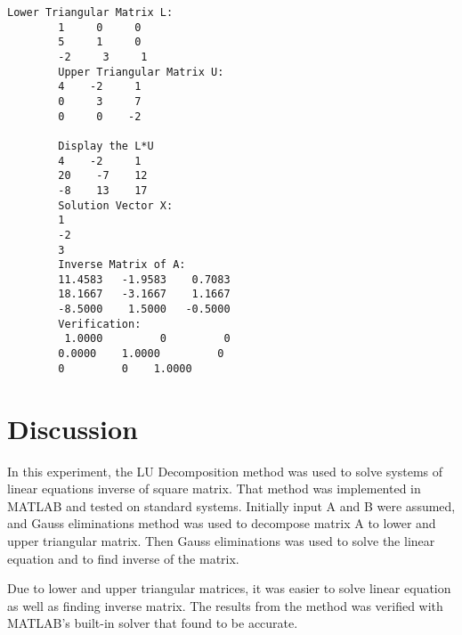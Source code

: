 \documentclass[a4paper,12pt]{article}
\begin{document}
	\begin{lstlisting}[style=vscode-light, caption={Command Window for LU Decomposition} ]
		Lower Triangular Matrix L:
		1     0     0
		5     1     0
		-2     3     1
		Upper Triangular Matrix U:
		4    -2     1
		0     3     7
		0     0    -2

		Display the L*U
		4    -2     1
		20    -7    12
		-8    13    17
		Solution Vector X:
		1
		-2
		3
		Inverse Matrix of A:
		11.4583   -1.9583    0.7083
		18.1667   -3.1667    1.1667
		-8.5000    1.5000   -0.5000
	    Verification:
	     1.0000         0         0
	    0.0000    1.0000         0
	    0         0    1.0000
	\end{lstlisting}
	
	
	
	\section{Discussion}
	In this experiment, the LU Decomposition method was used to solve systems of linear equations inverse of square matrix. That method was implemented in MATLAB and tested on standard systems. Initially input A and B  were assumed, and Gauss eliminations method was used to decompose matrix A to lower and upper triangular matrix. Then Gauss eliminations was used to solve the linear equation and to find inverse of the matrix.
	
    Due to lower and upper triangular matrices, it was easier to solve linear equation as well as finding inverse matrix. The results from the method was verified with MATLAB’s built-in solver that found to be accurate.
	
	
	
	
	
	
	
	
\end{document}
